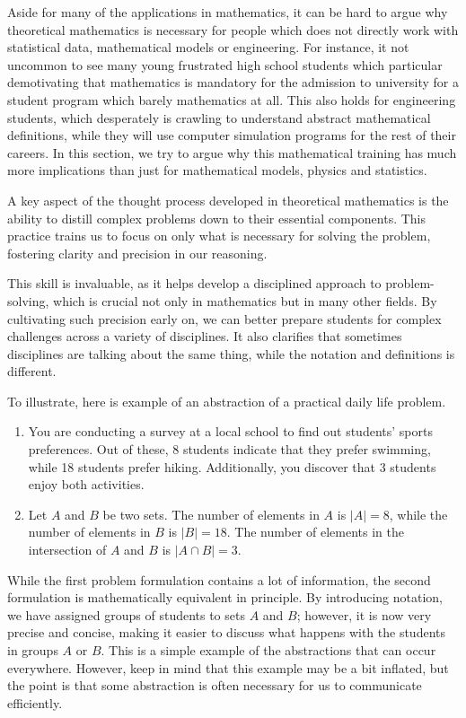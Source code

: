 \documentclass[10pt,conference]{IEEEtran}
\begin{document}
\begin{sloppy}
Aside for many of the applications in mathematics, it can be hard to argue why theoretical mathematics is necessary for people which does not directly work with statistical data, mathematical models or engineering.
For instance, it not uncommon to see many young
frustrated high school students
which particular demotivating that
mathematics is mandatory for the admission to university for a student program which barely mathematics at all. This also holds for engineering students, which desperately is crawling to understand abstract mathematical definitions, while they will use computer
simulation programs for the rest of their careers. In this section, we try to argue why this mathematical training has much more implications than just for mathematical models, physics and statistics.

A key aspect of the thought process developed in theoretical mathematics is the ability to distill complex problems down to their essential components. This practice trains us to focus on only what is necessary for solving the problem, fostering clarity and precision in our reasoning.

This skill is invaluable, as it helps develop a disciplined approach to problem-solving, which is crucial not only in mathematics but in many other fields. By cultivating such precision early on, we can better prepare students for complex challenges
across a variety of disciplines. It also clarifies that sometimes disciplines are talking about the same thing, while the notation and definitions is different.

To illustrate, here is example of an abstraction of a practical daily life problem.

\begin{enumerate}[label=\arabic*)]
    \item
You are conducting a survey at a local school to find out students' sports preferences. Out of these, 8 students indicate that they prefer swimming, while 18 students prefer hiking.
Additionally, you discover that 3 students enjoy both activities.
    \item Let \( A \) and \( B \) be two sets. The number of elements in \( A \) is \( |A| = 8 \), while the number of elements in \( B \) is \( |B| = 18 \). The number of elements in the intersection of \( A \) and \( B \) is \( |A \cap B| = 3 \).

\end{enumerate}

While the first problem formulation contains a lot of information, the second formulation is mathematically equivalent in principle. By introducing notation, we have assigned groups of students to sets \( A \) and \( B \); however, it is now very
precise and concise, making it easier to discuss what happens with the students in groups \( A \) or \( B \).
This is a simple example of the abstractions that can occur everywhere. However, keep in mind that this example may be a bit inflated, but the point is that some abstraction is often necessary for us to communicate efficiently.



\end{sloppy}
\end{document}
